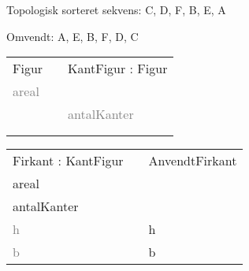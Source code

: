 \begin{frame}[fragile] 
 Topologisk sorteret sekvens: C, D, F, B, E, A
 
 	\begin{figure}[ht]
  \begin{center}
  \end{center}
  \label{fig:topological}
\end{figure}

 Omvendt: A, E, B, F, D, C
\end{frame}


\begin{frame}[fragile] 
\begin{table}[h]
\begin{tabular}{|l|l|l|}
 \cline{1-1} \cline{3-3} 
Figur          &  & KantFigur : Figur    \\ \cline{1-1} \cline{3-3} 
\textcolor{gray}{areal} &  &                      \\
               &  &  \textcolor{gray}{antalKanter} \\
               &  &                      \\
               &  &                      \\ \cline{1-1} \cline{3-3} 
\end{tabular}
\end{table}
\begin{table}[h]
\begin{tabular}{|l|l|l|}
 \cline{1-1} \cline{3-3} 
Firkant : KantFigur &  & AnvendtFirkant       \\ \cline{1-1} \cline{3-3} 
areal      &  &                      \\
antalKanter     &  &                      \\
\textcolor{gray}{h}          &  & h               \\
\textcolor{gray}{b}          &  & b              \\ \cline{1-1} \cline{3-3} 
\end{tabular}
\end{table}
\end{frame}

